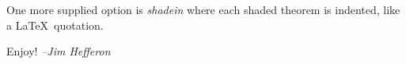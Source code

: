 \documentclass{article} %
\begin{document}
One more supplied option is \emph{shadein} where each shaded theorem
is indented, like a \LaTeX\ quotation.
%

Enjoy!
\textit{--Jim Hefferon}
\end{document}
